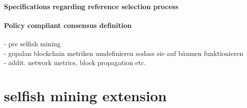 \paragraph{Specifications regarding reference selection process}
\paragraph{Policy compliant consensus definition}




- pre selfish mining\\
- gopalan blockchain metriken umdefinieren sodass sie auf bäumen funktionieren \\ 
- addit. network metrics, block propagation etc.

\section{selfish mining extension}







